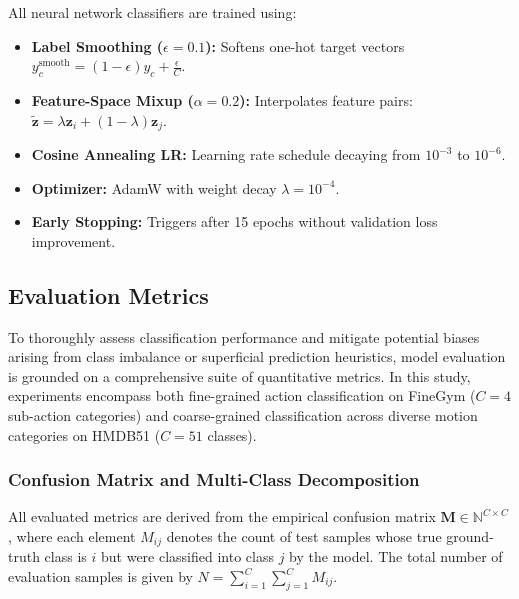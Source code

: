 All neural network classifiers are trained using:
\begin{itemize}[leftmargin=*]
    \item \textbf{Label Smoothing ($\epsilon = 0.1$):} Softens one-hot target vectors $y_c^{\text{smooth}} = (1 - \epsilon) y_c + \frac{\epsilon}{C}$.
    \item \textbf{Feature-Space Mixup ($\alpha = 0.2$):} Interpolates feature pairs: $\tilde{\mathbf{z}} = \lambda \mathbf{z}_i + (1-\lambda)\mathbf{z}_j$.
    \item \textbf{Cosine Annealing LR:} Learning rate schedule decaying from $10^{-3}$ to $10^{-6}$.
    \item \textbf{Optimizer:} AdamW with weight decay $\lambda=10^{-4}$.
    \item \textbf{Early Stopping:} Triggers after 15 epochs without validation loss improvement.
\end{itemize}

\subsection{Evaluation Metrics}
\label{sec:eval_metrics}

To thoroughly assess classification performance and mitigate potential biases arising from class imbalance or superficial prediction heuristics, model evaluation is grounded on a comprehensive suite of quantitative metrics. In this study, experiments encompass both fine-grained action classification on FineGym ($C = 4$ sub-action categories) and coarse-grained classification across diverse motion categories on HMDB51 ($C = 51$ classes).

\subsubsection{Confusion Matrix and Multi-Class Decomposition}

All evaluated metrics are derived from the empirical confusion matrix $\mathbf{M} \in \mathbb{N}^{C \times C}$, where each element $M_{ij}$ denotes the count of test samples whose true ground-truth class is $i$ but were classified into class $j$ by the model. The total number of evaluation samples is given by $N = \sum_{i=1}^{C}\sum_{j=1}^{C} M_{ij}$.

